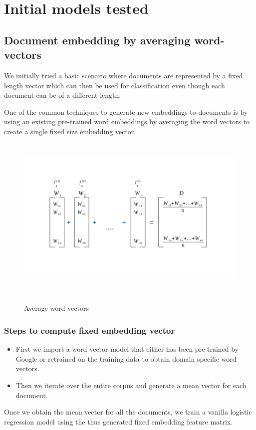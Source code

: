 \newpage
\chapter{Initial models tested}

\section{Document embedding by averaging word-vectors}

We initially tried a basic scenario where documents are represented by a fixed length vector which can then be used for classification even though each document can be of a different length.

One of the common techniques to generate new embeddings to documents is by using an existing pre-trained word embeddings by averaging the word vectors to create a single fixed size embedding vector.

\begin{figure}[htbp]
\centering
\includegraphics[width=16cm, height=8cm]{images/average-vectors.png}\\
\centering
\caption{Average word-vectors}
\label{fig:foo}
\end{figure}

\subsection{Steps to compute fixed embedding vector}

\begin{itemize}
\item {First we import a word vector model that either has been pre-trained by Google or retrained on the training data to obtain domain specific word vectors.}
\item {Then we iterate over the entire corpus and generate a mean vector for each document.}
\end{itemize}
Once we obtain the mean vector for all the documents, we train a vanilla logistic regression model using the thus generated fixed embedding feature matrix.

